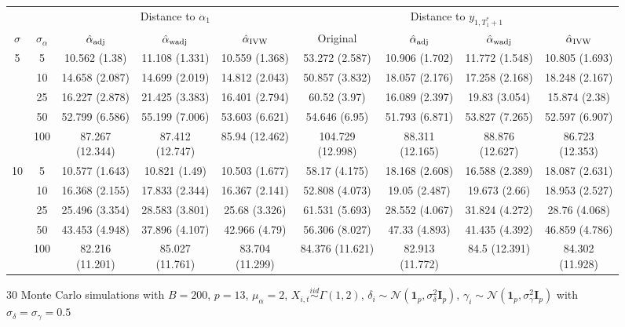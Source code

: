 \documentclass[10pt]{article}
\newcommand{\simiid}{\stackrel{iid}{\sim}} %
\def\normal#1#2{\mathcal{N}(#1,#2)} %
\theoremstyle{definition}
\begin{document}
\begin{sidewaysfigure}
\centering
\caption{30 Monte Carlo simulations  with $B = 200$, $p = 13$, $\mu_{\alpha}=2$, $X_{i,t} \simiid \Gamma(1,2)$, $\delta_i \sim \normal{\mathbf{1}_p}{\sigma^2_{\delta}\mathbf{I}_p}$, $\gamma_i \sim \normal{\mathbf{1}_p}{\sigma^2_{\gamma}\mathbf{I}_p}$ with $\sigma_{\delta}=\sigma_{\gamma}=0.5$}
\begin{tabular}{cc|ccc|cccc}
  & & \multicolumn{3}{c|}{Distance to $\alpha_1$}  & \multicolumn{4}{c}{Distance to $y_{1, T_1^*+1}$}  \\ 
  $\sigma$   & $\sigma_{\alpha}$ & $\hat{\alpha}_{\rm adj}$  & $\hat{\alpha}_{\rm wadj}$ & $\hat{\alpha}_{\rm IVW}$ & Original & $\hat{\alpha}_{\rm adj}$ & $\hat{\alpha}_{\rm wadj}$ & $\hat{\alpha}_{\rm IVW}$\\[.3cm]  
  \hline
 \multirow{5}{*}{5} & 5  & 10.562 (1.38) & 11.108 (1.331) & 10.559 (1.368) & 53.272 (2.587) & 10.906 (1.702) & 11.772 (1.548) & 10.805 (1.693) \\ 
    & 10  & 14.658 (2.087) & 14.699 (2.019) & 14.812 (2.043) & 50.857 (3.832) & 18.057 (2.176) & 17.258 (2.168) & 18.248 (2.167) \\ 
    & 25  & 16.227 (2.878) & 21.425 (3.383) & 16.401 (2.794) & 60.52 (3.97) & 16.089 (2.397) & 19.83 (3.054) & 15.874 (2.38) \\ 
    & 50  & 52.799 (6.586) & 55.199 (7.006) & 53.603 (6.621) & 54.646 (6.95) & 51.793 (6.871) & 53.827 (7.265) & 52.597 (6.907) \\ 
    & 100  & 87.267 (12.344) & 87.412 (12.747) & 85.94 (12.462) & 104.729 (12.998) & 88.311 (12.165) & 88.876 (12.627) & 86.723 (12.353) \\[.3cm]  
   \multirow{5}{*}{10} & 5  & 10.577 (1.643) & 10.821 (1.49) & 10.503 (1.677) & 58.17 (4.175) & 18.168 (2.608) & 16.588 (2.389) & 18.087 (2.631) \\ 
    & 10  & 16.368 (2.155) & 17.833 (2.344) & 16.367 (2.141) & 52.808 (4.073) & 19.05 (2.487) & 19.673 (2.66) & 18.953 (2.527) \\ 
    & 25  & 25.496 (3.354) & 28.583 (3.801) & 25.68 (3.326) & 61.531 (5.693) & 28.552 (4.067) & 31.824 (4.272) & 28.76 (4.068) \\ 
    & 50  & 43.453 (4.948) & 37.896 (4.107) & 42.966 (4.79) & 56.306 (8.027) & 47.33 (4.893) & 41.435 (4.392) & 46.859 (4.786) \\ 
    & 100  & 82.216 (11.201) & 85.027 (11.761) & 83.704 (11.299) & 84.376 (11.621) & 82.913 (11.772) & 84.5 (12.391) & 84.302 (11.928)\\[.3cm]  

\end{tabular}
\end{sidewaysfigure}
\end{document}
